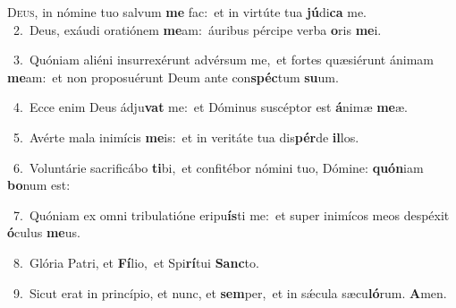 \lettrine{\initial\textcolor{\initialcolor}{D}}{eus,} in nómine tuo salvum \textbf{me} fac:~\star et in virtúte tua \textbf{jú}\-di\textbf{ca} me.\\
{\numbfont\textcolor{\numbcolor}{~2.}}~Deus, exáudi oratiónem \textbf{me}\-am:~\star áuribus pércipe verba \textbf{o}\-ris \textbf{me}\-i.\par
{\numbfont\textcolor{\numbcolor}{~3.}}~Quóniam aliéni insurrexérunt advérsum me,~\dagger et fortes quæsiérunt ánimam \textbf{me}\-am:~\star et non proposuérunt Deum ante con\-\textbf{spéc}\-tum \textbf{su}\-um.\par
{\numbfont\textcolor{\numbcolor}{~4.}}~Ecce enim Deus ádju\textbf{vat} me:~\star et Dóminus suscéptor est \textbf{á}\-nimæ \textbf{me}\-æ.\par
{\numbfont\textcolor{\numbcolor}{~5.}}~Avérte mala inimícis \textbf{me}\-is:~\star et in veritáte tua dis\-\textbf{pér}\-de \textbf{il}\-los.\par
{\numbfont\textcolor{\numbcolor}{~6.}}~Voluntárie sacrificábo \textbf{ti}\-bi,~\star et confitébor nómini tuo, Dómine: \textbf{quón}\-iam \textbf{bo}\-num est:\par
{\numbfont\textcolor{\numbcolor}{~7.}}~Quóniam ex omni tribulatióne eripu\-\textbf{ís}\-ti me:~\star et super inimícos meos despéxit \textbf{ó}\-culus \textbf{me}\-us.\par
{\numbfont\textcolor{\numbcolor}{~8.}}~Glória Patri, et \textbf{Fí}\-lio,~\star et Spi\-\textbf{rí}\-tui \textbf{Sanc}\-to.\par
{\numbfont\textcolor{\numbcolor}{~9.}}~Sicut erat in princípio, et nunc, et \textbf{sem}\-per,~\star et in sǽcula sæcu\-\textbf{ló}\-rum. \textbf{A}\-men.\par
